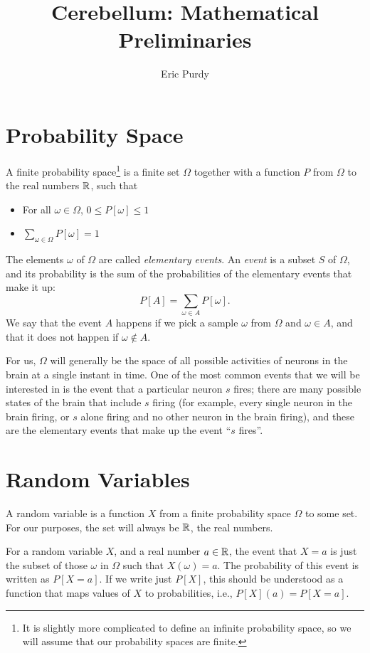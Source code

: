 \documentclass{article}
\title{Cerebellum: Mathematical Preliminaries} \author{Eric Purdy}
\theoremstyle{definition}
\begin{document}
\maketitle

\section{Probability Space}

A finite probability space\footnote{It is slightly more complicated to
  define an infinite probability space, so we will assume that our
  probability spaces are finite.} is a finite set $\Omega$ together
with a function $P$ from $\Omega$ to the real numbers $\mathbb{R}$, such that
\begin{itemize}
\item For all $\omega \in \Omega$, $0 \le P[\omega] \le 1$
\item $\sum_{\omega\in \Omega} P[\omega] = 1$
\end{itemize}

The elements $\omega$ of $\Omega$ are called {\em elementary events}.
An {\em event} is a subset $S$ of $\Omega$, and its probability is the
sum of the probabilities of the elementary events that make it up:
$$P[A] = \sum_{\omega \in A} P[\omega].$$ We say that the event $A$
happens if we pick a sample $\omega$ from $\Omega$ and $\omega \in A$,
and that it does not happen if $\omega \notin A$.

For us, $\Omega$ will generally be the space of all possible
activities of neurons in the brain at a single instant in time. One of
the most common events that we will be interested in is the event that
a particular neuron $s$ fires; there are many possible states of the
brain that include $s$ firing (for example, every single neuron in the
brain firing, or $s$ alone firing and no other neuron in the brain
firing), and these are the elementary events that make up the event
``$s$ fires''.

\section{Random Variables}

A random variable is a function $X$ from a finite probability space
$\Omega$ to some set. For our purposes, the set will always be $\mathbb{R}$,
the real numbers.

For a random variable $X$, and a real number $a \in \mathbb{R}$, the event
that $X=a$ is just the subset of those $\omega$ in $\Omega$ such that
$X(\omega) = a$. The probability of this event is written as $P[X=a]$.
If we write just $P[X]$, this should be understood as a function that
maps values of $X$ to probabilities, i.e., $P[X](a) = P[X = a]$.
\end{document}

